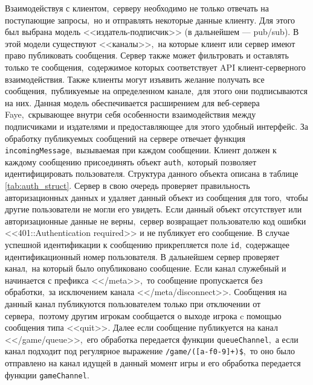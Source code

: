 \documentclass[14pt,a4paper]{report}
\begin{document}
Взаимодействуя с клиентом,~серверу необходимо не только отвечать на поступающие запросы,~но и отправлять некоторые данные клиенту. Для этого был выбрана модель <<издатель-подписчик>> (в дальнейшем --- pub/sub). В этой модели существуют <<каналы>>,~на которые клиент или сервер имеют право публиковать сообщения. Сервер также может фильтровать и оставлять только те сообщения,~содержимое которых соответствует API клиент-серверного взаимодействия. Также клиенты могут изъявить желание получать все сообщения,~публикуемые на определенном канале,~для этого они подписываются на них. Данная модель обеспечивается расширением для веб-сервера Faye,~скрывающее внутри себя особенности взаимодействия между подписчиками и издателями и предоставляющее для этого удобный интерфейс. За обработку публикуемых сообщений на сервере отвечает функция \lstinline$incomingMessage$,~вызываемая при каждом сообщении. Клиент должен к каждому сообщению присоединять объект \lstinline$auth$,~который позволяет идентифицировать пользователя. Структура данного объекта описана в таблице \ref{tab:auth_struct}. Сервер в свою очередь проверяет правильность авторизационных данных и удаляет данный объект из сообщения для того,~чтобы другие пользователи не могли его увидеть. Если данный объект отсутствует или авторизационные данные не верны,~сервер возвращает пользователю код ошибки <<401::Authentication required>> и не публикует его сообщение. В случае успешной идентификации к сообщению прикрепляется поле \lstinline$id$,~содержащее идентификационный номер пользователя. В дальнейшем сервер проверяет канал,~на который было опубликовано сообщение. Если канал служебный и начинается с префикса <</meta>>,~то сообщение пропускается без обработки,~за исключением канала <</meta/disconnect>>. Сообщения на данный канал публикуются пользователем только при отключении от сервера,~поэтому другим игрокам сообщается о выходе игрока c помощью сообщения типа <<quit>>. Далее если сообщение публикуется на канал <</game/queue>>,~его обработка передается функции \lstinline$queueChannel$,~а если канал подходит под регулярное выражение \lstinline{/game/([a-f0-9]+)$},~то оно было отправлено на канал идущей в данный момент игры и его обработка передается функции \lstinline$gameChannel$.
\end{document}

